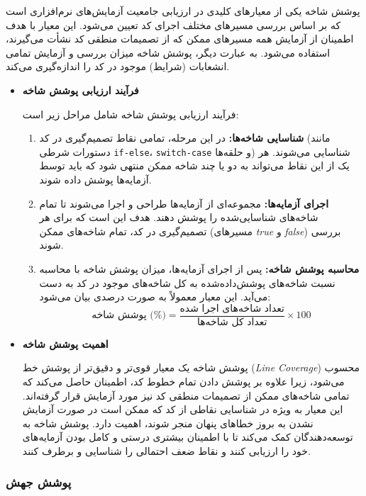 پوشش شاخه  یکی از معیارهای کلیدی در ارزیابی جامعیت آزمایش‌های نرم‌افزاری است که بر اساس بررسی مسیرهای مختلف اجرای کد تعیین می‌شود. این معیار با هدف اطمینان از آزمایش همه مسیرهای ممکن که از تصمیمات منطقی کد نشأت می‌گیرند، استفاده می‌شود. به عبارت دیگر، پوشش شاخه میزان بررسی و آزمایش تمامی انشعابات (شرایط) موجود در کد را اندازه‌گیری می‌کند.
\begin{itemize}
	
	\item \textbf{فرآیند ارزیابی پوشش شاخه}

فرآیند ارزیابی پوشش شاخه شامل مراحل زیر است:

\begin{enumerate}
	\item \textbf{شناسایی شاخه‌ها:} در این مرحله، تمامی نقاط تصمیم‌گیری در کد (مانند دستورات شرطی \texttt{if-else}، \texttt{switch-case} و حلقه‌ها) شناسایی می‌شوند. هر یک از این نقاط می‌تواند به دو یا چند شاخه ممکن منتهی شود که باید توسط آزمایه‌ها پوشش داده شوند.
	\item \textbf{اجرای آزمایه‌ها:} مجموعه‌ای از آزمایه‌ها طراحی و اجرا می‌شوند تا تمام شاخه‌های شناسایی‌شده را پوشش دهند. هدف این است که برای هر تصمیم‌گیری در کد، تمام شاخه‌های ممکن (مسیرهای \textit{true} و \textit{false}) بررسی شوند.
	\item \textbf{محاسبه پوشش شاخه:} پس از اجرای آزمایه‌ها، میزان پوشش شاخه با محاسبه نسبت شاخه‌های پوشش‌داده‌شده به کل شاخه‌های موجود در کد به دست می‌آید. این معیار معمولاً به صورت درصدی بیان می‌شود:
	\[
	\text{پوشش شاخه (\%)} = \frac{\text{تعداد شاخه‌های اجرا شده}}{\text{تعداد کل شاخه‌ها}} \times 100
	\]
\end{enumerate}

\item \textbf{اهمیت پوشش شاخه}

پوشش شاخه یک معیار قوی‌تر و دقیق‌تر از پوشش خط (\textit{Line Coverage}) محسوب می‌شود، زیرا علاوه بر پوشش دادن تمام خطوط کد، اطمینان حاصل می‌کند که تمامی شاخه‌های ممکن از تصمیمات منطقی کد نیز مورد آزمایش قرار گرفته‌اند. این معیار به ویژه در شناسایی نقاطی از کد که ممکن است در صورت آزمایش نشدن به بروز خطاهای پنهان منجر شوند، اهمیت دارد. پوشش شاخه به توسعه‌دهندگان کمک می‌کند تا با اطمینان بیشتری درستی و کامل بودن آزمایه‌های خود را ارزیابی کنند و نقاط ضعف احتمالی را شناسایی و برطرف کنند.
\end{itemize}

\subsubsection{پوشش جهش}

